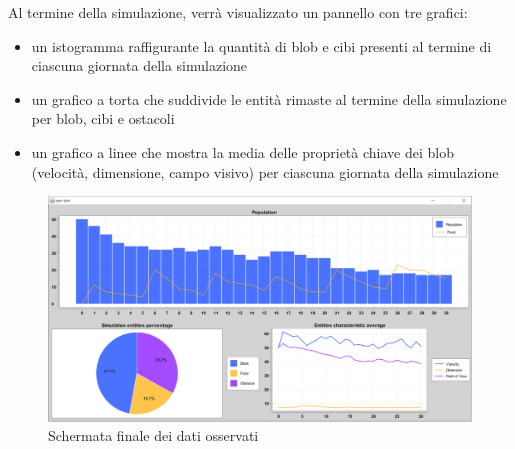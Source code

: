 Al termine della simulazione, verrà visualizzato un pannello con tre grafici:
\begin{itemize}
\item un istogramma raffigurante la quantità di blob e cibi presenti al termine di ciascuna giornata della simulazione
\item un grafico a torta che suddivide le entità rimaste al termine della simulazione per blob, cibi e ostacoli
\item un grafico a linee che mostra la media delle proprietà chiave dei blob (velocità, dimensione, campo visivo) per ciascuna giornata della simulazione
\end{itemize}

\begin{figure}[h!]
\centering
\includegraphics[width=\textwidth, scale=0.44]{img/ResultsInterface.png}
\caption{Schermata finale dei dati osservati}
\label{fig:ResultsInterface}
\end{figure}
